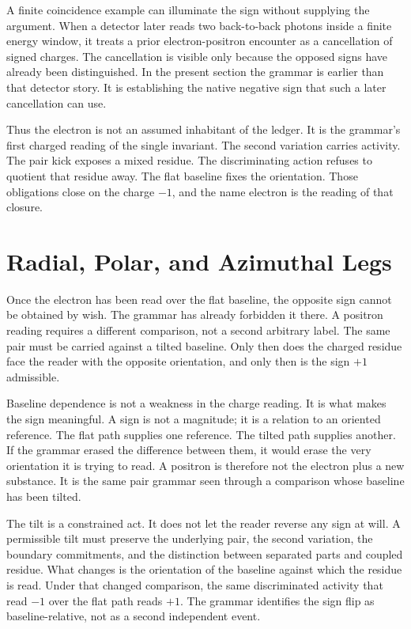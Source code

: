A finite coincidence example can illuminate the sign without supplying the
argument. When a detector later reads two back-to-back photons inside a
finite energy window, it treats a prior electron-positron encounter as a
cancellation of signed charges. The cancellation is visible only because the
opposed signs have already been distinguished. In the present section the
grammar is earlier than that detector story. It is establishing the native
negative sign that such a later cancellation can use.

Thus the electron is not an assumed inhabitant of the ledger. It is the
grammar's first charged reading of the single invariant. The second
variation carries activity. The pair kick exposes a mixed residue. The
discriminating action refuses to quotient that residue away. The flat
baseline fixes the orientation. Those obligations close on the charge
\(-1\), and the name electron is the reading of that closure.

\section{Radial, Polar, and Azimuthal Legs}

Once the electron has been read over the flat baseline, the opposite sign
cannot be obtained by wish. The grammar has already forbidden it there. A
positron reading requires a different comparison, not a second arbitrary
label. The same pair must be carried against a tilted baseline. Only then
does the charged residue face the reader with the opposite orientation, and
only then is the sign \(+1\) admissible.

Baseline dependence is not a weakness in the charge reading. It is what
makes the sign meaningful. A sign is not a magnitude; it is a relation to an
oriented reference. The flat path supplies one reference. The tilted path
supplies another. If the grammar erased the difference between them, it would
erase the very orientation it is trying to read. A positron is therefore not
the electron plus a new substance. It is the same pair grammar seen through a
comparison whose baseline has been tilted.

The tilt is a constrained act. It does not let the reader reverse any sign at
will. A permissible tilt must preserve the underlying pair, the second
variation, the boundary commitments, and the distinction between separated
parts and coupled residue. What changes is the orientation of the baseline
against which the residue is read. Under that changed comparison, the same
discriminated activity that read \(-1\) over the flat path reads \(+1\). The
grammar identifies the sign flip as baseline-relative, not as a second
independent event.

